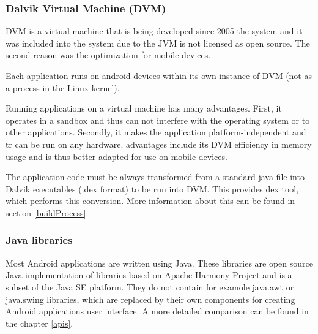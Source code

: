 \subsubsection{Dalvik Virtual Machine (DVM)}
DVM is a virtual machine that is being developed since 2005 the system and it was included into the system due to the JVM is not licensed as open source. The second reason was the optimization for mobile devices. 

Each application runs on android devices within its own instance of DVM (not as a process in the Linux kernel).

Running applications on a virtual machine has many advantages. First, it operates in a sandbox and thus can not interfere with the operating system or to other applications. Secondly, it makes the application platform-independent and tr can be run on any hardware. advantages include its DVM efficiency in memory usage and is thus better adapted for use on mobile devices.

The application code must be always transformed from a standard java file into Dalvik executables (.dex format) to be run into DVM. This provides dex tool, which performs this conversion. More information about this can be found in section \ref{buildProcess}.

\subsubsection{Java libraries}
Most Android applications are written using Java. These libraries are open source Java implementation of libraries based on Apache Harmony Project and is a subset of the Java SE platform. They do not contain for examole java.awt or java.swing libraries, which are replaced by their own components for creating Android applications user interface. A more detailed comparison can be found in the chapter \ref{apis}.

